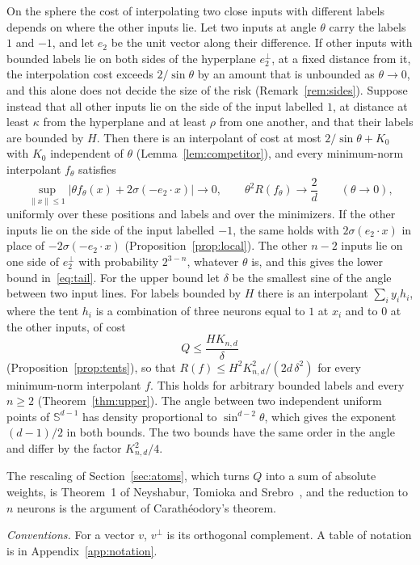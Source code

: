 \documentclass[11pt]{amsart}
\theoremstyle{remark}
\numberwithin{equation}{section}
\newcommand{\Sph}{\mathbb{S}^{d-1}}
\begin{document}
On the sphere the cost of interpolating two close inputs with different labels depends on where the other inputs lie. Let two inputs at angle $\theta$ carry the labels $1$ and $-1$, and let $e_2$ be the unit vector along their difference. If other inputs with bounded labels lie on both sides of the hyperplane $e_2^\perp$, at a fixed distance from it, the interpolation cost exceeds $2/\sin\theta$ by an amount that is unbounded as $\theta\to0$, and this alone does not decide the size of the risk (Remark~\ref{rem:sides}). Suppose instead that all other inputs lie on the side of the input labelled $1$, at distance at least $\kappa$ from the hyperplane and at least $\rho$ from one another, and that their labels are bounded by $H$. Then there is an interpolant of cost at most $2/\sin\theta+K_0$ with $K_0$ independent of $\theta$ (Lemma~\ref{lem:competitor}), and every minimum-norm interpolant $f_\theta$ satisfies
\[
\sup_{\|x\|\le1}\bigl|\theta f_\theta(x)+2\sigma(-e_2\cdot x)\bigr|\to0,\qquad
\theta^2R(f_\theta)\to\frac2d\qquad(\theta\to0),
\]
uniformly over these positions and labels and over the minimizers. If the other inputs lie on the side of the input labelled $-1$, the same holds with $2\sigma(e_2\cdot x)$ in place of $-2\sigma(-e_2\cdot x)$ (Proposition~\ref{prop:local}). The other $n-2$ inputs lie on one side of $e_2^\perp$ with probability $2^{3-n}$, whatever $\theta$ is, and this gives the lower bound in~\eqref{eq:tail}. For the upper bound let $\delta$ be the smallest sine of the angle between two input lines. For labels bounded by $H$ there is an interpolant $\sum_iy_ih_i$, where the tent $h_i$ is a combination of three neurons equal to $1$ at $x_i$ and to $0$ at the other inputs, of cost
\[
Q\le\frac{HK_{n,d}}{\delta}
\]
(Proposition~\ref{prop:tents}), so that $R(f)\le H^2K_{n,d}^2/(2d\,\delta^2)$ for every minimum-norm interpolant $f$. This holds for arbitrary bounded labels and every $n\ge2$ (Theorem~\ref{thm:upper}). The angle between two independent uniform points of $\Sph$ has density proportional to $\sin^{d-2}\theta$, which gives the exponent $(d-1)/2$ in both bounds. The two bounds have the same order in the angle and differ by the factor $K_{n,d}^2/4$.

The rescaling of Section~\ref{sec:atoms}, which turns $Q$ into a sum of absolute weights, is Theorem~1 of Neyshabur, Tomioka and Srebro~\cite{NTS}, and the reduction to $n$ neurons is the argument of Carath\'eodory's theorem.

\emph{Conventions.} For a vector $v$, $v^\perp$ is its orthogonal complement. A table of notation is in Appendix~\ref{app:notation}.
\end{document}
